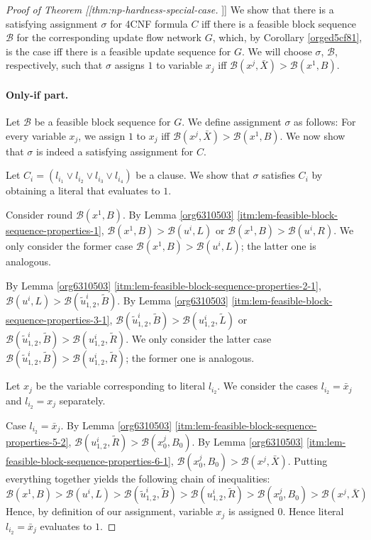 \documentclass[fontsize=11pt,paper=a4]{book}
\begin{document}
\begin{proof}[Proof of Theorem [[thm:np-hardness-special-case]]]
We show that there is a satisfying assignment \(\sigma\) for 4CNF formula \(C\) iff there is a feasible block sequence \(\mathcal{B}\) for the corresponding update flow network \(G\), which, by Corollary \ref{orged5cf81}, is the case iff there is a feasible update sequence for \(G\).
We will choose \(\sigma\), \(\mathcal{B}\), respectively, such that \(\sigma\) assigns \(1\) to variable \(x_j\) iff \(\mathcal{B}(x^j,\bar{X})>\mathcal{B}(x^1,B)\).

\paragraph{Only-if part.}
Let \(\mathcal{B}\) be a feasible block sequence for \(G\).
We define assignment \(\sigma\) as follows:
For every variable \(x_j\), we assign \(1\) to \(x_j\) iff \(\mathcal{B}(x^j,\bar{X})>\mathcal{B}(x^1,B)\).
We now show that \(\sigma\) is indeed a satisfying assignment for \(C\).

Let \(C_i=(l_{i_1}\vee l_{i_2}\vee l_{i_3}\vee l_{i_4})\) be a clause.
We show that \(\sigma\) satisfies \(C_i\) by obtaining a literal that evaluates to \(1\).

Consider round \(\mathcal{B}(x^1,B)\).
By Lemma \ref{org6310503} \ref{itm:lem-feasible-block-sequence-properties-1}, \(\mathcal{B}(x^1,B)>\mathcal{B}(u^i,L)\) or \(\mathcal{B}(x^1,B)>\mathcal{B}(u^i,R)\).
We only consider the former case \(\mathcal{B}(x^1,B)>\mathcal{B}(u^i,L)\); the latter one is analogous.

By Lemma \ref{org6310503} \ref{itm:lem-feasible-block-sequence-properties-2-1}, \(\mathcal{B}(u^i,L)>\mathcal{B}(\tilde{u}_{1,2}^i,\tilde{B})\).
By Lemma \ref{org6310503} \ref{itm:lem-feasible-block-sequence-properties-3-1}, \(\mathcal{B}(\tilde{u}_{1,2}^i,\tilde{B})>\mathcal{B}(u_{1,2}^i,\tilde{L})\) or \(\mathcal{B}(\tilde{u}_{1,2}^i,\tilde{B})>\mathcal{B}(u_{1,2}^i,\tilde{R})\).
We only consider the latter case \(\mathcal{B}(\tilde{u}_{1,2}^i,\tilde{B})>\mathcal{B}(u_{1,2}^i,\tilde{R})\); the former one is analogous.

Let \(x_j\) be the variable corresponding to literal \(l_{i_2}\).
We consider the cases \(l_{i_2}=\bar{x}_j\) and \(l_{i_2}=x_j\) separately.

Case \(l_{i_2}=\bar{x}_j\).
By Lemma \ref{org6310503} \ref{itm:lem-feasible-block-sequence-properties-5-2}, \(\mathcal{B}(u_{1,2}^i,\tilde{R})>\mathcal{B}(x_0^j,B_0)\).
By Lemma \ref{org6310503} \ref{itm:lem-feasible-block-sequence-properties-6-1}, \(\mathcal{B}(x_0^j,B_0)>\mathcal{B}(x^j,\bar{X})\).
Putting everything together yields the following chain of inequalities:
\[
\mathcal{B}(x^1,B)>
\mathcal{B}(u^i,L)>
\mathcal{B}(\tilde{u}_{1,2}^i,\tilde{B})>
\mathcal{B}(u_{1,2}^i,\tilde{R})>
\mathcal{B}(x_0^j,B_0)>
\mathcal{B}(x^j,\bar{X})
\]
Hence, by definition of our assignment, variable \(x_j\) is assigned \(0\).
Hence literal \(l_{i_2}=\bar{x}_j\) evaluates to \(1\).


\end{proof}
\end{document}
